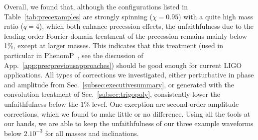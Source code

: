 \documentclass[aps,showpacs,twocolumn,
prd,superscriptaddress,nofootinbib]{revtex4-1}
\begin{document}
Overall, we found that, although the configurations listed in Table~\ref{tab:precexamples} are strongly spinning ($\chi = 0.95$) with a quite high mass ratio ($q=4$), which both enhance precession effects, the unfaithfulness due to the leading-order Fourier-domain treatment of the precession remains mainly below 1\%, except at larger masses. This indicates that this treatment (used in particular in PhenomP~\cite{Hannam+13}, see the discussion of App.~\ref{app:precpreviousapproaches}) should be good enough for current LIGO applications. All types of corrections we investigated, either perturbative in phase and amplitude from Sec.~\ref{subsec:executivesummary}, or generated with the convolution treatment of Sec.~\ref{subsec:trigopoly}, consistently lower the unfaithfulness below the 1\% level. One exception are second-order amplitude corrections, which we found to make little or no difference. Using all the tools at our hands, we are able to keep the unfaithfulness of our three example waveforms below $2.10^{-3}$ for all masses and inclinations.
\end{document}
